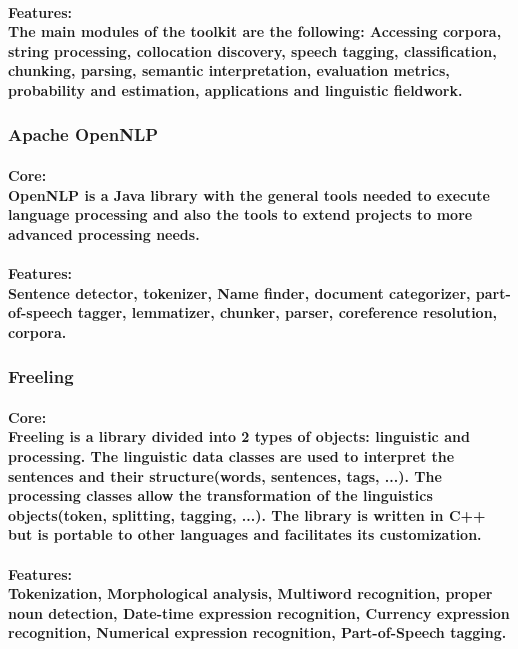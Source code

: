 \documentclass[12pt,journal,compsoc]{IEEEtran}
\begin{document}
\paragraph{Features:\\ The main modules of the toolkit are the following: Accessing corpora, string processing, collocation discovery, speech tagging, classification, chunking, parsing, semantic interpretation, evaluation metrics, probability and estimation, applications and linguistic fieldwork.\\
\cite{nltk book}}
\subsubsection{Apache OpenNLP}
\paragraph{Core:\\OpenNLP is a Java library with the general tools needed to execute language processing and also the tools to extend projects to more advanced processing needs.\cite{Opennlp}}
\paragraph{Features:\\Sentence detector, tokenizer, Name finder, document categorizer, part-of-speech tagger, lemmatizer, chunker, parser, coreference resolution, corpora. }

\subsubsection{Freeling}
\paragraph{Core: \\
Freeling is a library divided into 2 types of objects: linguistic and processing. The linguistic data classes are used to interpret the sentences and their structure(words, sentences, tags, ...). The processing classes allow the transformation of the linguistics objects(token, splitting, tagging, ...). The library is written in C++ but is portable to other languages and facilitates its customization.\cite{Freeling}}
\paragraph{Features:\\
Tokenization, Morphological analysis, Multiword recognition, proper noun detection, Date-time expression recognition, Currency expression recognition, Numerical expression recognition, Part-of-Speech tagging.}
\end{document}
